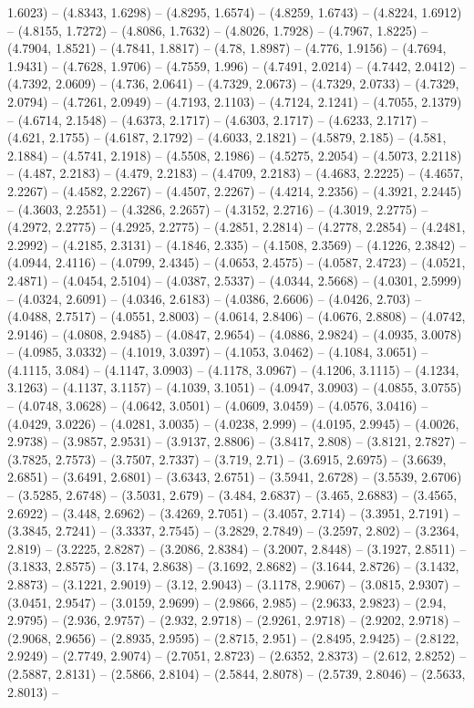 1.6023) -- (4.8343, 1.6298) -- (4.8295, 1.6574) -- (4.8259, 1.6743) -- (4.8224, 1.6912) -- (4.8155, 1.7272) -- (4.8086, 1.7632) -- (4.8026, 1.7928) -- (4.7967, 1.8225) -- (4.7904, 1.8521) -- (4.7841, 1.8817) -- (4.78, 1.8987) -- (4.776, 1.9156) -- (4.7694, 1.9431) -- (4.7628, 1.9706) -- (4.7559, 1.996) -- (4.7491, 2.0214) -- (4.7442, 2.0412) -- (4.7392, 2.0609) -- (4.736, 2.0641) -- (4.7329, 2.0673) -- (4.7329, 2.0733) -- (4.7329, 2.0794) -- (4.7261, 2.0949) -- (4.7193, 2.1103) -- (4.7124, 2.1241) -- (4.7055, 2.1379) -- (4.6714, 2.1548) -- (4.6373, 2.1717) -- (4.6303, 2.1717) -- (4.6233, 2.1717) -- (4.621, 2.1755) -- (4.6187, 2.1792) -- (4.6033, 2.1821) -- (4.5879, 2.185) -- (4.581, 2.1884) -- (4.5741, 2.1918) -- (4.5508, 2.1986) -- (4.5275, 2.2054) -- (4.5073, 2.2118) -- (4.487, 2.2183) -- (4.479, 2.2183) -- (4.4709, 2.2183) -- (4.4683, 2.2225) -- (4.4657, 2.2267) -- (4.4582, 2.2267) -- (4.4507, 2.2267) -- (4.4214, 2.2356) -- (4.3921, 2.2445) -- (4.3603, 2.2551) -- (4.3286, 2.2657) -- (4.3152, 2.2716) -- (4.3019, 2.2775) -- (4.2972, 2.2775) -- (4.2925, 2.2775) -- (4.2851, 2.2814) -- (4.2778, 2.2854) -- (4.2481, 2.2992) -- (4.2185, 2.3131) -- (4.1846, 2.335) -- (4.1508, 2.3569) -- (4.1226, 2.3842) -- (4.0944, 2.4116) -- (4.0799, 2.4345) -- (4.0653, 2.4575) -- (4.0587, 2.4723) -- (4.0521, 2.4871) -- (4.0454, 2.5104) -- (4.0387, 2.5337) -- (4.0344, 2.5668) -- (4.0301, 2.5999) -- (4.0324, 2.6091) -- (4.0346, 2.6183) -- (4.0386, 2.6606) -- (4.0426, 2.703) -- (4.0488, 2.7517) -- (4.0551, 2.8003) -- (4.0614, 2.8406) -- (4.0676, 2.8808) -- (4.0742, 2.9146) -- (4.0808, 2.9485) -- (4.0847, 2.9654) -- (4.0886, 2.9824) -- (4.0935, 3.0078) -- (4.0985, 3.0332) -- (4.1019, 3.0397) -- (4.1053, 3.0462) -- (4.1084, 3.0651) -- (4.1115, 3.084) -- (4.1147, 3.0903) -- (4.1178, 3.0967) -- (4.1206, 3.1115) -- (4.1234, 3.1263) -- (4.1137, 3.1157) -- (4.1039, 3.1051) -- (4.0947, 3.0903) -- (4.0855, 3.0755) -- (4.0748, 3.0628) -- (4.0642, 3.0501) -- (4.0609, 3.0459) -- (4.0576, 3.0416) -- (4.0429, 3.0226) -- (4.0281, 3.0035) -- (4.0238, 2.999) -- (4.0195, 2.9945) -- (4.0026, 2.9738) -- (3.9857, 2.9531) -- (3.9137, 2.8806) -- (3.8417, 2.808) -- (3.8121, 2.7827) -- (3.7825, 2.7573) -- (3.7507, 2.7337) -- (3.719, 2.71) -- (3.6915, 2.6975) -- (3.6639, 2.6851) -- (3.6491, 2.6801) -- (3.6343, 2.6751) -- (3.5941, 2.6728) -- (3.5539, 2.6706) -- (3.5285, 2.6748) -- (3.5031, 2.679) -- (3.484, 2.6837) -- (3.465, 2.6883) -- (3.4565, 2.6922) -- (3.448, 2.6962) -- (3.4269, 2.7051) -- (3.4057, 2.714) -- (3.3951, 2.7191) -- (3.3845, 2.7241) -- (3.3337, 2.7545) -- (3.2829, 2.7849) -- (3.2597, 2.802) -- (3.2364, 2.819) -- (3.2225, 2.8287) -- (3.2086, 2.8384) -- (3.2007, 2.8448) -- (3.1927, 2.8511) -- (3.1833, 2.8575) -- (3.174, 2.8638) -- (3.1692, 2.8682) -- (3.1644, 2.8726) -- (3.1432, 2.8873) -- (3.1221, 2.9019) -- (3.12, 2.9043) -- (3.1178, 2.9067) -- (3.0815, 2.9307) -- (3.0451, 2.9547) -- (3.0159, 2.9699) -- (2.9866, 2.985) -- (2.9633, 2.9823) -- (2.94, 2.9795) -- (2.936, 2.9757) -- (2.932, 2.9718) -- (2.9261, 2.9718) -- (2.9202, 2.9718) -- (2.9068, 2.9656) -- (2.8935, 2.9595) -- (2.8715, 2.951) -- (2.8495, 2.9425) -- (2.8122, 2.9249) -- (2.7749, 2.9074) -- (2.7051, 2.8723) -- (2.6352, 2.8373) -- (2.612, 2.8252) -- (2.5887, 2.8131) -- (2.5866, 2.8104) -- (2.5844, 2.8078) -- (2.5739, 2.8046) -- (2.5633, 2.8013) -- 